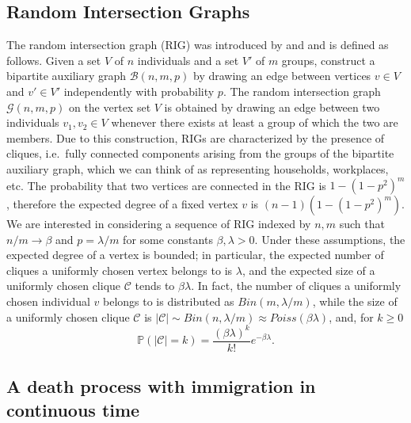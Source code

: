 \documentclass{article}
\theoremstyle{remark}
\newtheorem*{partial proof}{Partial proof of the Conjecture}
\begin{document}
\subsection{Random Intersection Graphs}
\label{Sec:RIG}
The random intersection graph (RIG) was introduced by \cite{singer1996random} and \cite{karonski1999random} and is defined as follows. Given a set $V$ of $n$ individuals and a set $V'$ of $m$ groups, construct a bipartite auxiliary graph $\mathcal{B}(n,m,p)$ by drawing an edge between vertices $v \in V$ and $v' \in V'$ independently with probability $p$. The random intersection graph $\mathcal{G}(n,m,p)$ on the vertex set $V$ is obtained by drawing an edge between two individuals $v_1,v_2 \in V$ whenever there exists at least a group of which the two are members. Due to this construction, RIGs are characterized by the presence of cliques, i.e.\ fully connected components arising from the groups of the bipartite auxiliary graph, which we can think of as representing households, workplaces, etc.
The probability that two vertices are connected in the RIG is $1-\left(1-p^2 \right)^m$, therefore the expected degree of a fixed vertex $v$ is $\left( n-1 \right) \left( 1-\left(1-p^2 \right)^m \right)$. We are interested in considering a sequence of RIG indexed by $n,m$ such that $n/m \to \beta$ and $p=\lambda/m$ for some constants $\beta,\lambda >0$. Under these assumptions, the expected degree of a vertex is bounded; in particular, the expected number of cliques a uniformly chosen vertex belongs to is $\lambda$, and the expected size of a uniformly chosen clique $\mathcal{C}$ tends to $\beta \lambda$. In fact, the number of cliques a uniformly chosen individual $v$ belongs to is distributed as $Bin(m, \lambda/m)$, while the size of a uniformly chosen clique $\mathcal{C}$ is $\lvert \mathcal{C}\rvert \sim Bin(n, \lambda/m) \approx Poiss(\beta \lambda)$, and, for $k \geq 0$
\begin{equation}
\label{eq: size of C}
    \mathbb{P}(\lvert \mathcal{C}\rvert=k)= \frac{(\beta \lambda)^k}{k!}e^{-\beta \lambda}.
\end{equation}

\subsection{A death process with immigration in continuous time}
\label{Sec:Process}
\end{document}
